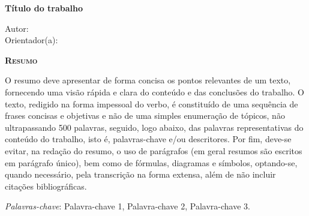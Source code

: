 \begin{center}
	{\Large{\textbf{Título do trabalho}}}
\end{center}

\vspace{1cm}

\begin{flushright}
	Autor: \writeauthor \\
	Orientador(a): \writeteacher
\end{flushright}

\vspace{1cm}

\begin{center}
	\Large{\textsc{\textbf{Resumo}}}
\end{center}

\noindent O resumo deve apresentar de forma concisa os pontos relevantes de um
texto, fornecendo uma visão rápida e clara do conteúdo e das conclusões do
trabalho. O texto, redigido na forma impessoal do verbo, é constituído de uma
sequência de frases concisas e objetivas e não de uma simples enumeração de
tópicos, não ultrapassando 500 palavras, seguido, logo abaixo, das palavras
representativas do conteúdo do trabalho, isto é, palavras-chave e/ou
descritores. Por fim, deve-se evitar, na redação do resumo, o uso de parágrafos
(em geral resumos são escritos em parágrafo único), bem como de fórmulas,
diagramas e símbolos, optando-se, quando necessário, pela transcrição na forma
extensa, além de não incluir citações bibliográficas.

\noindent\textit{Palavras-chave}: Palavra-chave 1, Palavra-chave 2, Palavra-chave 3.